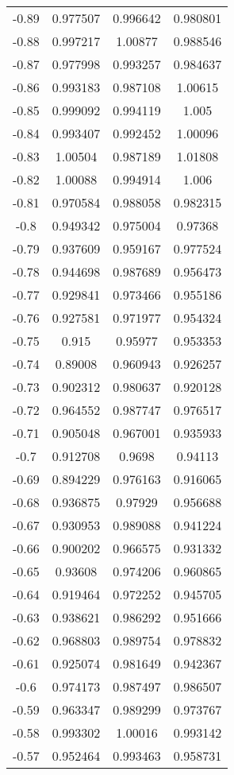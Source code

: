 \begin{table}[h!]
\begin{tabular}{|c|c|c|c|}
-0.89 & 0.977507 & 0.996642 & 0.980801 \\
-0.88 & 0.997217 & 1.00877 & 0.988546 \\
-0.87 & 0.977998 & 0.993257 & 0.984637 \\
-0.86 & 0.993183 & 0.987108 & 1.00615 \\
-0.85 & 0.999092 & 0.994119 & 1.005 \\
-0.84 & 0.993407 & 0.992452 & 1.00096 \\
-0.83 & 1.00504 & 0.987189 & 1.01808 \\
-0.82 & 1.00088 & 0.994914 & 1.006 \\
-0.81 & 0.970584 & 0.988058 & 0.982315 \\
-0.8 & 0.949342 & 0.975004 & 0.97368 \\
-0.79 & 0.937609 & 0.959167 & 0.977524 \\
-0.78 & 0.944698 & 0.987689 & 0.956473 \\
-0.77 & 0.929841 & 0.973466 & 0.955186 \\
-0.76 & 0.927581 & 0.971977 & 0.954324 \\
-0.75 & 0.915 & 0.95977 & 0.953353 \\
-0.74 & 0.89008 & 0.960943 & 0.926257 \\
-0.73 & 0.902312 & 0.980637 & 0.920128 \\
-0.72 & 0.964552 & 0.987747 & 0.976517 \\
-0.71 & 0.905048 & 0.967001 & 0.935933 \\
-0.7 & 0.912708 & 0.9698 & 0.94113 \\
-0.69 & 0.894229 & 0.976163 & 0.916065 \\
-0.68 & 0.936875 & 0.97929 & 0.956688 \\
-0.67 & 0.930953 & 0.989088 & 0.941224 \\
-0.66 & 0.900202 & 0.966575 & 0.931332 \\
-0.65 & 0.93608 & 0.974206 & 0.960865 \\
-0.64 & 0.919464 & 0.972252 & 0.945705 \\
-0.63 & 0.938621 & 0.986292 & 0.951666 \\
-0.62 & 0.968803 & 0.989754 & 0.978832 \\
-0.61 & 0.925074 & 0.981649 & 0.942367 \\
-0.6 & 0.974173 & 0.987497 & 0.986507 \\
-0.59 & 0.963347 & 0.989299 & 0.973767 \\
-0.58 & 0.993302 & 1.00016 & 0.993142 \\
-0.57 & 0.952464 & 0.993463 & 0.958731 \\

\end{tabular}
\end{table}
